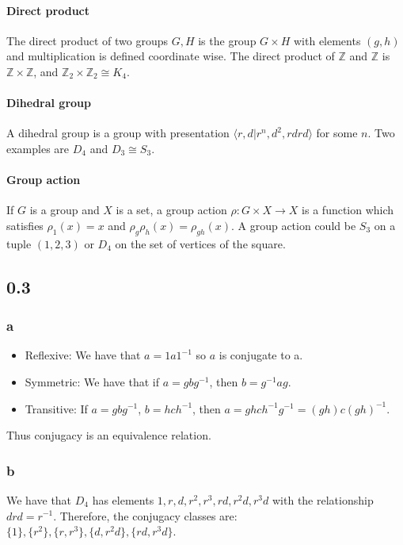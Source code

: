 \documentclass[]{article}
\begin{document}
\paragraph{Direct product} The direct product of two groups $G, H$ is the group $G \times H$ with elements $(g, h)$ and multiplication is defined coordinate wise. The direct product of $\mathbb{Z}$ and $\mathbb{Z}$ is $\mathbb{Z} \times \mathbb{Z}$, and $\mathbb{Z}_2 \times \mathbb{Z}_2 \cong K_4$. 
\paragraph{Dihedral group} A dihedral group is a group with presentation $\langle r, d | r^n, d^2 , rdrd \rangle$ for some $n$. Two examples are $D_4$ and $D_3 \cong S_3$. 
\paragraph{Group action} If $G$ is a group and $X$ is a set, a group action $\rho: G \times X \rightarrow X $ is a function which satisfies $\rho_1(x) = x$ and $\rho_g \rho_h(x) = \rho_{gh} (x)$. A group action could be $S_3$ on a tuple $(1, 2, 3)$ or $D_4$ on the set of vertices of the square.

\subsection*{0.3}
\subsubsection*{a}
\begin{itemize}
	\item Reflexive: We have that $a = 1 a 1^{-1}$ so $a$ is conjugate to a.
	\item Symmetric: We have that if $a = g b g^{-1}$, then $b = g^{-1} a g$. 
	\item Transitive: If $a = g b g^{-1}$, $b = h c h^{-1}$, then $a = gh c h^{-1} g^{-1} = (gh) c (gh)^{-1}$. 
\end{itemize}
Thus conjugacy is an equivalence relation. 
\subsubsection*{b}
We have that $D_4$ has elements $1, r, d, r^2, r^3, rd, r^2d, r^3d$ with the relationship $drd = r^{-1}$. Therefore, the conjugacy classes are: $\lbrace 1 \rbrace, \lbrace r^2 \rbrace, \lbrace r, r^3 \rbrace, \lbrace d, r^2 d \rbrace, \lbrace rd, r^3 d \rbrace$. 
\end{document}
